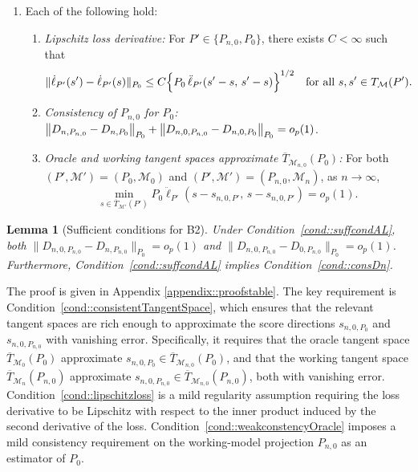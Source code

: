 \documentclass[11pt]{article}
\newtheorem{lemma}{Lemma}
\theoremstyle{definition}
\begin{document}
\begin{enumerate}[label=\textbf{\ref{cond::consDn}*}), ref={\ref{cond::consDn}*}]
\item \label{cond::suffcondAL} Each of the following hold:

\begin{enumerate}[label={ \alph*.}, ref=\ref{cond::suffcondAL}\alph*,leftmargin=15pt]
\item \textit{Lipschitz loss derivative:} \label{cond::lipschitzloss} For $P' \in \{P_{n,0}, P_0\}$, there exists $C < \infty$ such that 
$$
\|\dot{\ell}_{P'}(s') - \dot{\ell}_{P'}(s)\|_{P_0} 
   \leq C \Bigl\{ P_0\,\ddot{\ell}_{P'}(s' - s,\, s' - s) \Bigr\}^{1/2}
   \quad \text{for all } s, s' \in T_{\mathcal{M}}(P').
$$
\item \textit{Consistency of $P_{n,0}$ for $P_0$: } $\norm{D_{n, P_{n,0}} - D_{n, P_0}}_{P_0} +  \norm{D_{n, 0, P_{n,0}} - D_{n, 0, P_0}}_{P_0}= o_p(1)$. \label{cond::weakconstencyOracle}
\item \textit{Oracle and working tangent spaces approximate \(\overline{T}_{\mathcal{M}_{n,0}}(P_0)\):} \label{cond::consistentTangentSpace}
For both \((P',\mathcal{M}')=(P_0,\mathcal{M}_0)\) and \((P',\mathcal{M}')=(P_{n,0},\mathcal{M}_n)\), as $n \rightarrow \infty$,
\[
\min_{s \in \overline{T}_{\mathcal{M}'}(P')}
P_0\ddot{\ell}_{P'}(s-s_{n,0,P'},\,s-s_{n,0,P'}) = o_p(1).
\]
 
\end{enumerate}
 
\end{enumerate}

\begin{lemma}[Sufficient conditions for B2]
Under Condition~\ref{cond::suffcondAL}, both \(\|D_{n,0,P_{n,0}} - D_{n,P_{n,0}}\|_{P_0} = o_p(1)\) and \(\|D_{n,0,P_{n,0}} - D_{0,P_{n,0}}\|_{P_0} = o_p(1)\). Furthermore, Condition~\ref{cond::suffcondAL} implies Condition~\ref{cond::consDn}.
\label{lemma::stableLogLik}
\end{lemma}


  The proof is given in Appendix \ref{appendix::proofstable}. The key requirement is Condition~\ref{cond::consistentTangentSpace}, which ensures that the relevant tangent spaces are rich enough to approximate the score directions \(s_{n,0,P_0}\) and \(s_{n,0,P_{n,0}}\) with vanishing error. Specifically, it requires that the oracle tangent space \(\overline{T}_{\mathcal{M}_0}(P_0)\) approximate \(s_{n,0,P_0} \in \overline{T}_{\mathcal{M}_{n,0}}(P_0)\), and that the working tangent space \(\overline{T}_{\mathcal{M}_n}(P_{n,0})\) approximate \(s_{n,0,P_{n,0}} \in \overline{T}_{\mathcal{M}_{n,0}}(P_{n,0})\), both with vanishing error. Condition~\ref{cond::lipschitzloss} is a mild regularity assumption requiring the loss derivative to be Lipschitz with respect to the inner product induced by the second derivative of the loss. Condition~\ref{cond::weakconstencyOracle} imposes a mild consistency requirement on the working-model projection \(P_{n,0}\) as an estimator of \(P_0\).
\end{document}
